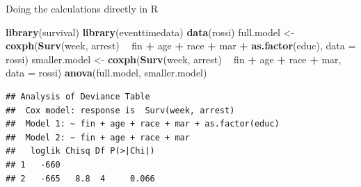 \documentclass[ignorenonframetext,]{beamer}
\newenvironment{Shaded}{\begin{snugshade}}{\end{snugshade}}
\newcommand{\DataTypeTok}[1]{\textcolor[rgb]{0.13,0.29,0.53}{#1}}
\newcommand{\KeywordTok}[1]{\textcolor[rgb]{0.13,0.29,0.53}{\textbf{#1}}}
\newcommand{\NormalTok}[1]{#1}
\newcommand{\OperatorTok}[1]{\textcolor[rgb]{0.81,0.36,0.00}{\textbf{#1}}}
\newcommand{\StringTok}[1]{\textcolor[rgb]{0.31,0.60,0.02}{#1}}
\begin{document}
\begin{frame}[fragile]{%
\protect\hypertarget{doing-the-calculations-directly-in-r}{%
Doing the calculations directly in R}}

\footnotesize

\begin{Shaded}
\begin{Highlighting}[]
\KeywordTok{library}\NormalTok{(survival)}
\KeywordTok{library}\NormalTok{(eventtimedata)}
\KeywordTok{data}\NormalTok{(rossi)}
\NormalTok{full.model <-}\StringTok{ }\KeywordTok{coxph}\NormalTok{(}\KeywordTok{Surv}\NormalTok{(week, arrest) }\OperatorTok{~}\StringTok{ }\NormalTok{fin }\OperatorTok{+}\StringTok{ }\NormalTok{age }\OperatorTok{+}\StringTok{ }\NormalTok{race }\OperatorTok{+}\StringTok{ }\NormalTok{mar }
      \OperatorTok{+}\StringTok{ }\KeywordTok{as.factor}\NormalTok{(educ), }\DataTypeTok{data =}\NormalTok{ rossi)}
\NormalTok{smaller.model <-}\StringTok{ }\KeywordTok{coxph}\NormalTok{(}\KeywordTok{Surv}\NormalTok{(week, arrest) }\OperatorTok{~}\StringTok{ }\NormalTok{fin }\OperatorTok{+}\StringTok{ }\NormalTok{age }\OperatorTok{+}\StringTok{ }\NormalTok{race }\OperatorTok{+}\StringTok{ }\NormalTok{mar, }
                       \DataTypeTok{data =}\NormalTok{ rossi)}
\KeywordTok{anova}\NormalTok{(full.model, smaller.model)}
\end{Highlighting}
\end{Shaded}

\begin{verbatim}
## Analysis of Deviance Table
##  Cox model: response is  Surv(week, arrest)
##  Model 1: ~ fin + age + race + mar + as.factor(educ)
##  Model 2: ~ fin + age + race + mar
##   loglik Chisq Df P(>|Chi|)
## 1   -660                   
## 2   -665   8.8  4     0.066
\end{verbatim}

\end{frame}
\end{document}
